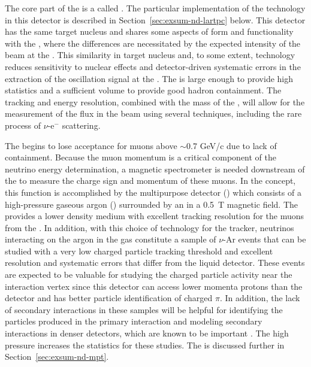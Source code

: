 The core part of the   is a  called .  The particular implementation of the  technology in this detector is described in Section~\ref{sec:exsum-nd-lartpc} below.  
This detector has the same target nucleus and shares some aspects of form and functionality with the , where the differences are necessitated by the expected intensity of the beam at the .  This similarity in target nucleus and, to some extent, technology reduces sensitivity to nuclear effects and detector-driven systematic errors in the extraction of the oscillation signal at the  .  The  is large enough to provide high statistics and a sufficient volume to provide good hadron containment.  The tracking and energy resolution, combined with the mass of the , will allow for the measurement of the flux in the beam using several techniques, including the rare process of $\nu$-e$^{-}$ scattering.

The  begins to lose acceptance for muons above $\sim$0.7 GeV/c due to lack of containment.  Because the muon momentum is a critical component of the neutrino energy determination, a magnetic spectrometer is needed downstream of the  to measure the charge sign and momentum of these muons.  In the   concept, this function is accomplished by the multipurpose detector () which consists of a high-pressure gaseous argon  () surrounded by an  in a \SI{0.5}{T} magnetic field. The  provides a lower density medium with excellent tracking resolution for the muons from the .  In addition, with this choice of technology for the tracker, neutrinos interacting on the argon in the gas  constitute a sample of $\nu$-Ar events that can be studied with a very low charged particle tracking threshold and excellent resolution and systematic errors that differ from the liquid detector. These events are expected to be valuable for studying the charged particle activity near the interaction vertex since this detector can access lower momenta protons than the  detector and has better particle identification of charged $\pi$.  In addition, the lack of secondary interactions in these samples will be helpful for identifying the particles produced in the primary interaction and modeling secondary interactions in denser detectors, which are known to be important \cite{Friedland:2018vry}.
The high pressure increases the statistics for these studies.  
The  is  discussed further in Section~\ref{sec:exsum-nd-mpt}.


